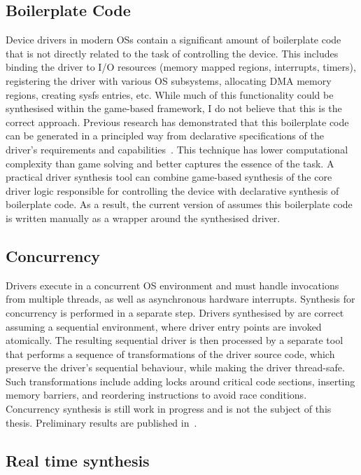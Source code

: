 \subsection{Boilerplate Code}

Device drivers in modern OSs contain a significant amount of boilerplate code that is not directly related to the task of controlling the device.  This includes binding the driver to I/O resources (memory mapped regions, interrupts, timers), registering the driver with various OS subsystems, allocating DMA memory regions, creating sysfs entries, etc.  While much of this functionality could be synthesised within the game-based framework, I do not believe that this is the correct approach.  Previous research has demonstrated that this boilerplate code can be generated in a principled way from declarative specifications of the driver's requirements and capabilities~\cite{Spear_RHHL_06}.  This technique has lower computational complexity than game solving and better captures the essence of the task.  A practical driver synthesis tool can combine game-based synthesis of the core driver logic responsible for controlling the device with declarative synthesis of boilerplate code.  As a result, the current version of \termite assumes this boilerplate code is written manually as a wrapper around the synthesised driver.

\subsection{Concurrency}

Drivers execute in a concurrent OS environment and must handle invocations from multiple threads, as well as asynchronous hardware interrupts.  Synthesis for concurrency is performed in a separate step.  Drivers synthesised by \termite are correct assuming a sequential environment, where driver entry points are invoked atomically.  The resulting sequential driver is then processed by a separate tool that performs a sequence of transformations of the driver source code, which preserve the driver's sequential behaviour, while making the driver thread-safe.  Such transformations include adding locks around critical code sections, inserting memory barriers, and reordering instructions to avoid race conditions.  Concurrency synthesis is still work in progress and is not the subject of this thesis.  Preliminary results are published in~\cite{Cerny_HRRT_13, Cerny_HRRT_14, scheduling-cav15}.

\subsection{Real time synthesis}

